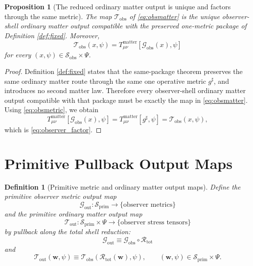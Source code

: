 \documentclass[11pt]{article}
\newcommand{\CompletedMetric}{g^{\sharp}}
\newcommand{\ReductionTriple}{\mathcal R_{\mathrm{tot}}}
\newcommand{\PrimShell}{\mathcal S_{\mathrm{prim}}}
\newcommand{\ObsShell}{\mathcal S_{\mathrm{obs}}}
\newcommand{\MetricOut}{\mathscr G_{\mathrm{out}}}
\newcommand{\MatterOut}{\mathscr T_{\mathrm{out}}}
\newcommand{\ObsMetricOut}{\mathscr G_{\mathrm{obs}}}
\newcommand{\ObsMatterOut}{\mathscr T_{\mathrm{obs}}}
\newtheorem{definition}{Definition}
\newtheorem{proposition}{Proposition}
\begin{document}
\begin{proposition}[The reduced ordinary matter output is unique and factors through the same metric]
\label{prop:obsmatter}
The map \(\ObsMatterOut\) of \eqref{eq:obsmatter} is the unique observer-shell ordinary matter output compatible with the preserved one-metric package of Definition \ref{def:fixed}. Moreover,
\begin{equation}
\ObsMatterOut(x,\psi)
=
T_{\mu\nu}^{\mathrm{matter}}[\ObsMetricOut(x),\psi]
\label{eq:observer_factor}
\end{equation}
for every \((x,\psi)\in\ObsShell\times\Psi\).
\end{proposition}

\begin{proof}
Definition \ref{def:fixed} states that the same-package theorem preserves the same ordinary matter route through the same one operative metric \(\CompletedMetric\), and introduces no second matter law. Therefore every observer-shell ordinary matter output compatible with that package must be exactly the map in \eqref{eq:obsmatter}. Using \eqref{eq:obsmetric}, we obtain
\[
T_{\mu\nu}^{\mathrm{matter}}[\ObsMetricOut(x),\psi]
=
T_{\mu\nu}^{\mathrm{matter}}[\CompletedMetric,\psi]
=
\ObsMatterOut(x,\psi),
\]
which is \eqref{eq:observer_factor}.
\end{proof}

\section{Primitive Pullback Output Maps}

\begin{definition}[Primitive metric and ordinary matter output maps]
\label{def:primitiveoutputs}
Define the primitive observer metric output map
\[
\MetricOut:\PrimShell\to\{\text{observer metrics}\}
\]
and the primitive ordinary matter output map
\[
\MatterOut:\PrimShell\times\Psi\to\{\text{observer stress tensors}\}
\]
by pullback along the total shell reduction:
\begin{equation}
\MetricOut
\equiv
\ObsMetricOut\circ\ReductionTriple
\label{eq:metricpullback}
\end{equation}
and
\begin{equation}
\MatterOut(\mathbf w,\psi)
\equiv
\ObsMatterOut(\ReductionTriple(\mathbf w),\psi),
\qquad
(\mathbf w,\psi)\in\PrimShell\times\Psi.
\label{eq:matterpullback}
\end{equation}
\end{definition}
\end{document}

